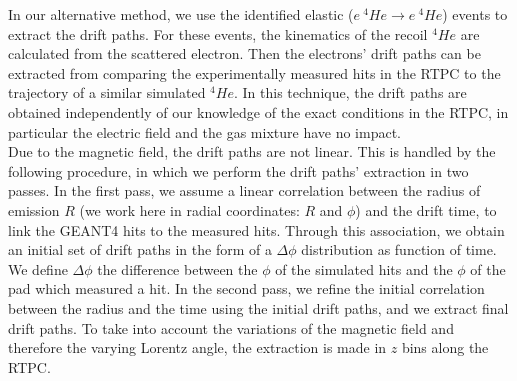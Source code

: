 In our alternative method, we use the identified elastic ($e ~ ^{4}He 
\rightarrow e ~ ^{4}He$) events to extract the drift paths. For these events, 
the kinematics of the recoil $^{4}He$ are calculated from the scattered 
electron. Then the electrons' drift paths can be extracted from comparing the 
experimentally measured hits in the RTPC to the trajectory of a similar 
simulated $^{4}He$. In this technique, the drift paths are obtained 
independently of our knowledge of the exact conditions in the RTPC, in 
particular the electric field and the gas mixture have no impact. \\

Due to the magnetic field, the drift paths are not linear. This is handled by 
the following procedure, in which we perform the drift paths' extraction in 
two passes. In the first pass, we assume a linear correlation between the 
radius of emission $R$ (we work here in radial coordinates: $R$ and $\phi$) and the 
drift time, to link the GEANT4 hits to the measured hits. Through this association, we obtain an 
initial set of drift paths in the form of a $\Delta \phi$ distribution as function of time. We define $\Delta \phi$ the 
difference between the $\phi$ of the simulated hits and the $\phi$ of the pad 
which measured a hit. In the second pass, we refine the initial 
correlation between the radius and the time using the initial drift paths, and 
we extract final drift paths. To take into account the variations of the magnetic 
field and therefore the varying Lorentz angle, the extraction 
is made in $z$ bins along the RTPC. \\


